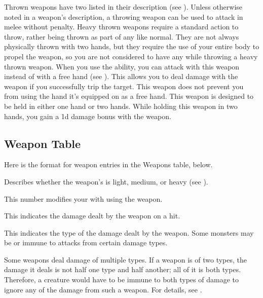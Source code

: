         Thrown weapons have two  listed in their description (see ).
        Unless otherwise noted in a weapon's description, a throwing weapon can be used to attack in melee without penalty.
        Heavy thrown weapons require a standard action to throw, rather being thrown as part of any  like normal.
        They are not always physically thrown with two hands, but they require the use of your entire body to propel the weapon, so you are not considered to have any  while throwing a heavy thrown weapon.
         When you use the  ability, you can attack with this weapon instead of with a free hand (see ).
        This allows you to deal damage with the weapon if you successfully trip the target.
         This weapon does not prevent you from using the hand it's equipped on as a free hand.
         This weapon is designed to be held in either one hand or two hands.
        While holding this weapon in two hands, you gain a \plus1d damage bonus with the weapon.

    \subsection{Weapon Table}
        Here is the format for weapon entries in the Weapons table, below.

         Describes whether the weapon's  is light, medium, or heavy (see ).

         This number modifies your  with  using the weapon.

         This  indicates the damage dealt by the weapon on a hit.

         This indicates the type of the damage dealt by the weapon.
        Some monsters may be  or immune to attacks from certain damage types.

        Some weapons deal damage of multiple types. If a weapon is of two types, the damage it deals is not half one type and half another; all of it is both types.
        Therefore, a creature would have to be immune to both types of damage to ignore any of the damage from such a weapon.
        For details, see .

